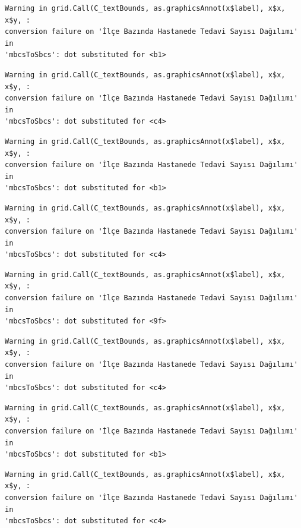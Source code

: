 \documentclass[
  11pt,
  a4paper,
  DIV=11,
  numbers=noendperiod]{scrartcl}
\begin{document}
\begin{verbatim}
Warning in grid.Call(C_textBounds, as.graphicsAnnot(x$label), x$x, x$y, :
conversion failure on 'İlçe Bazında Hastanede Tedavi Sayısı Dağılımı' in
'mbcsToSbcs': dot substituted for <b1>
\end{verbatim}

\begin{verbatim}
Warning in grid.Call(C_textBounds, as.graphicsAnnot(x$label), x$x, x$y, :
conversion failure on 'İlçe Bazında Hastanede Tedavi Sayısı Dağılımı' in
'mbcsToSbcs': dot substituted for <c4>
\end{verbatim}

\begin{verbatim}
Warning in grid.Call(C_textBounds, as.graphicsAnnot(x$label), x$x, x$y, :
conversion failure on 'İlçe Bazında Hastanede Tedavi Sayısı Dağılımı' in
'mbcsToSbcs': dot substituted for <b1>
\end{verbatim}

\begin{verbatim}
Warning in grid.Call(C_textBounds, as.graphicsAnnot(x$label), x$x, x$y, :
conversion failure on 'İlçe Bazında Hastanede Tedavi Sayısı Dağılımı' in
'mbcsToSbcs': dot substituted for <c4>
\end{verbatim}

\begin{verbatim}
Warning in grid.Call(C_textBounds, as.graphicsAnnot(x$label), x$x, x$y, :
conversion failure on 'İlçe Bazında Hastanede Tedavi Sayısı Dağılımı' in
'mbcsToSbcs': dot substituted for <9f>
\end{verbatim}

\begin{verbatim}
Warning in grid.Call(C_textBounds, as.graphicsAnnot(x$label), x$x, x$y, :
conversion failure on 'İlçe Bazında Hastanede Tedavi Sayısı Dağılımı' in
'mbcsToSbcs': dot substituted for <c4>
\end{verbatim}

\begin{verbatim}
Warning in grid.Call(C_textBounds, as.graphicsAnnot(x$label), x$x, x$y, :
conversion failure on 'İlçe Bazında Hastanede Tedavi Sayısı Dağılımı' in
'mbcsToSbcs': dot substituted for <b1>
\end{verbatim}

\begin{verbatim}
Warning in grid.Call(C_textBounds, as.graphicsAnnot(x$label), x$x, x$y, :
conversion failure on 'İlçe Bazında Hastanede Tedavi Sayısı Dağılımı' in
'mbcsToSbcs': dot substituted for <c4>
\end{verbatim}
\end{document}
